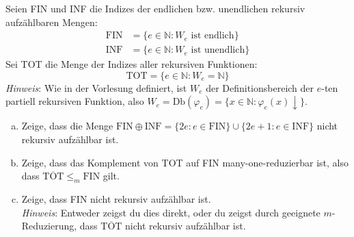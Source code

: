 \documentclass[german,headsepline]{scrartcl}
\begin{document}
	\begin{question}
		Seien FIN und INF die Indizes der endlichen bzw. unendlichen rekursiv aufzählbaren Mengen:
		\begin{align*}
			\text{FIN} &= \{e\in\mathbb{N}\colon W_e\text{ ist endlich}\} \\
			\text{INF} &= \{e\in\mathbb{N}\colon W_e\text{ ist unendlich}\}
		\end{align*}
		Sei TOT die Menge der Indizes aller rekursiven Funktionen:
			\[\text{TOT}=\{e\in\mathbb{N}\colon W_e=\mathbb{N}\}\]
		\textit{Hinweis}: Wie in der Vorlesung definiert,
		ist $W_e$ der Definitionsbereich der $e$-ten partiell rekursiven Funktion,
		also $W_e=\text{Db}(\varphi_e)=\{x\in\mathbb{N}\colon\varphi_e(x)\downarrow\}$.
		\begin{enumerate}[(a)]
			\item Zeige, dass die Menge
				$\text{FIN}\oplus\text{INF}=\{2e\colon e\in\text{FIN}\}\cup\{2e+1\colon e\in\text{INF}\}$
				nicht rekursiv aufzählbar ist.
			\item Zeige, dass das Komplement von TOT auf FIN many-one-reduzierbar ist,
				also dass $\overline{\text{TOT}}\leq_m\text{FIN}$ gilt.
			\item Zeige, dass FIN nicht rekursiv aufzählbar ist. \\
				\textit{Hinweis}: Entweder zeigst du dies direkt,
				oder du zeigst durch geeignete $m$-Reduzierung,
				dass $\overline{\text{TOT}}$ nicht rekursiv aufzählbar ist.
		\end{enumerate}
	\end{question}
\end{document}
